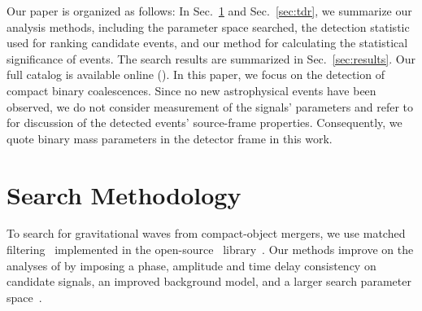 Our paper is organized as follows: In Sec.~\ref{sec:search} and Sec.~\ref{sec:tdr}, we summarize our analysis methods, including the parameter space searched, the detection statistic used for ranking candidate events, and our method for calculating the statistical significance of events. The search results are summarized in Sec.~\ref{sec:results}.  Our full catalog 
is available online (\release). In this paper, we focus on the detection of compact binary coalescences. Since no new astrophysical events have been observed, we do not consider measurement of the signals' parameters and refer to \cite{TheLIGOScientific:2016pea,Biwer:2018osg} for discussion of the detected events' source-frame properties. Consequently, we quote binary mass parameters in the detector frame in this work.

\section{Search Methodology}
\label{sec:search}

To search for gravitational waves from compact-object mergers, we use matched filtering~\citep{Allen:2005fk} implemented in the open-source \pycbc{}\ library~\citep{Usman:2015kfa,Canton:2014ena,pycbc-github}. Our methods improve on the analyses of \cite{TheLIGOScientific:2016pea,Abbott:2016ymx,TheLIGOScientific:2016qqj} by imposing a phase, amplitude and time delay consistency on candidate signals, an improved background model, and a larger search parameter space~\citep{Nitz:2017svb, Nitz:2017lco, DalCanton:2017ala}.

